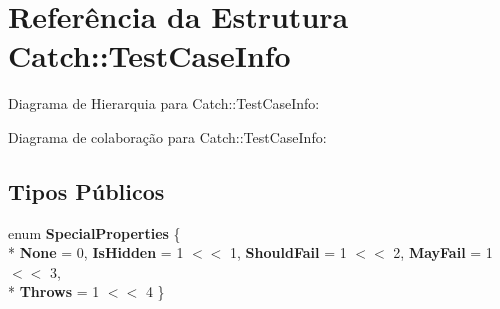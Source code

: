 \hypertarget{structCatch_1_1TestCaseInfo}{}\section{Referência da Estrutura Catch\+:\+:Test\+Case\+Info}
\label{structCatch_1_1TestCaseInfo}


Diagrama de Hierarquia para Catch\+:\+:Test\+Case\+Info\+:


Diagrama de colaboração para Catch\+:\+:Test\+Case\+Info\+:
\subsection*{Tipos Públicos}
\begin{DoxyCompactItemize}
\item 
enum {\bfseries Special\+Properties} \{ \\*
{\bfseries None} = 0, 
{\bfseries Is\+Hidden} = 1 $<$$<$ 1, 
{\bfseries Should\+Fail} = 1 $<$$<$ 2, 
{\bfseries May\+Fail} = 1 $<$$<$ 3, 
\\*
{\bfseries Throws} = 1 $<$$<$ 4
 \}\hypertarget{structCatch_1_1TestCaseInfo_a39b232f74b4a7a6f2183b96759027eac}{}\label{structCatch_1_1TestCaseInfo_a39b232f74b4a7a6f2183b96759027eac}

\end{DoxyCompactItemize}
